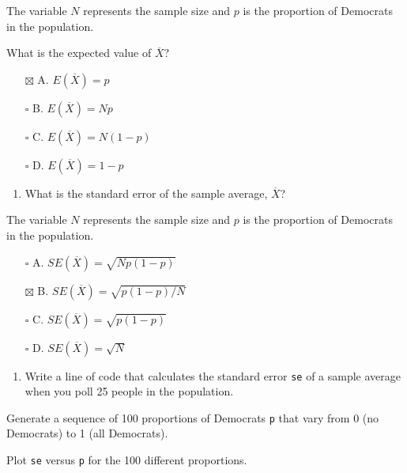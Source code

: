 \documentclass[
]{article}
\providecommand{\tightlist}{%
  \setlength{\itemsep}{0pt}\setlength{\parskip}{0pt}}
\begin{document}
The variable \(N\) represents the sample size and \(p\) is the
proportion of Democrats in the population.

What is the expected value of \(\overline{X}\)?

\begin{itemize}
\tightlist
\item[$\boxtimes$]
  A. \(E(\overline{X}) = p\)
\item[$\square$]
  B. \(E(\overline{X}) = Np\)
\item[$\square$]
  C. \(E(\overline{X}) = N(1−p)\)
\item[$\square$]
  D. \(E(\overline{X}) = 1−p\)
\end{itemize}

\begin{enumerate}
\def\labelenumi{\arabic{enumi}.}
\setcounter{enumi}{3}
\tightlist
\item
  What is the standard error of the sample average, \(\overline{X}\)?
\end{enumerate}

The variable \(N\) represents the sample size and \(p\) is the
proportion of Democrats in the population.

\begin{itemize}
\tightlist
\item[$\square$]
  A. \(SE(\overline{X}) = \sqrt{Np(1−p)}\)
\item[$\boxtimes$]
  B. \(SE(\overline{X}) = \sqrt{p(1−p)/N}\)
\item[$\square$]
  C. \(SE(\overline{X}) = \sqrt{p(1−p)}\)
\item[$\square$]
  D. \(SE(\overline{X}) = \sqrt N\)
\end{itemize}

\begin{enumerate}
\def\labelenumi{\arabic{enumi}.}
\setcounter{enumi}{4}
\tightlist
\item
  Write a line of code that calculates the standard error \texttt{se} of
  a sample average when you poll 25 people in the population.
\end{enumerate}

Generate a sequence of 100 proportions of Democrats \texttt{p} that vary
from 0 (no Democrats) to 1 (all Democrats).

Plot \texttt{se} versus \texttt{p} for the 100 different proportions.
\end{document}
